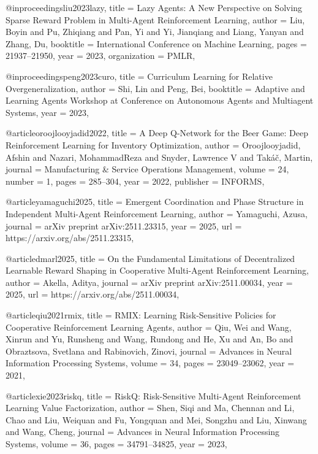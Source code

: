 @inproceedings{liu2023lazy,
  title        = {Lazy Agents: A New Perspective on Solving Sparse Reward Problem in Multi-Agent Reinforcement Learning},
  author       = {Liu, Boyin and Pu, Zhiqiang and Pan, Yi and Yi, Jianqiang and Liang, Yanyan and Zhang, Du},
  booktitle    = {International Conference on Machine Learning},
  pages        = {21937--21950},
  year         = {2023},
  organization = {PMLR},
}

@inproceedings{peng2023curo,
  title     = {Curriculum Learning for Relative Overgeneralization},
  author    = {Shi, Lin and Peng, Bei},
  booktitle = {Adaptive and Learning Agents Workshop at Conference on Autonomous Agents and Multiagent Systems},
  year      = {2023},
}

@article{oroojlooyjadid2022,
  title     = {A Deep {Q}-Network for the Beer Game: Deep Reinforcement Learning for Inventory Optimization},
  author    = {Oroojlooyjadid, Afshin and Nazari, MohammadReza and Snyder, Lawrence V and Tak{\'a}{\v{c}}, Martin},
  journal   = {Manufacturing \& Service Operations Management},
  volume    = {24},
  number    = {1},
  pages     = {285--304},
  year      = {2022},
  publisher = {INFORMS},
}

@article{yamaguchi2025,
  title   = {Emergent Coordination and Phase Structure in Independent Multi-Agent Reinforcement Learning},
  author  = {Yamaguchi, Azusa},
  journal = {arXiv preprint arXiv:2511.23315},
  year    = {2025},
  url     = {https://arxiv.org/abs/2511.23315},
}

@article{dmarl2025,
  title   = {On the Fundamental Limitations of Decentralized Learnable Reward Shaping in Cooperative Multi-Agent Reinforcement Learning},
  author  = {Akella, Aditya},
  journal = {arXiv preprint arXiv:2511.00034},
  year    = {2025},
  url     = {https://arxiv.org/abs/2511.00034},
}

@article{qiu2021rmix,
  title   = {{RMIX}: Learning Risk-Sensitive Policies for Cooperative Reinforcement Learning Agents},
  author  = {Qiu, Wei and Wang, Xinrun and Yu, Runsheng and Wang, Rundong and He, Xu and An, Bo and Obraztsova, Svetlana and Rabinovich, Zinovi},
  journal = {Advances in Neural Information Processing Systems},
  volume  = {34},
  pages   = {23049--23062},
  year    = {2021},
}

@article{xie2023riskq,
  title   = {{RiskQ}: Risk-Sensitive Multi-Agent Reinforcement Learning Value Factorization},
  author  = {Shen, Siqi and Ma, Chennan and Li, Chao and Liu, Weiquan and Fu, Yongquan and Mei, Songzhu and Liu, Xinwang and Wang, Cheng},
  journal = {Advances in Neural Information Processing Systems},
  volume  = {36},
  pages   = {34791--34825},
  year    = {2023},
}

